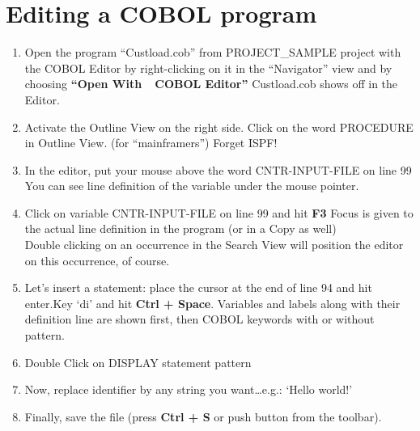 \chapter{Editing a COBOL program}

\begin{enumerate}
\item Open the program ``Custload.cob'' from PROJECT\_SAMPLE project with the COBOL Editor by right-clicking on it in the ``Navigator'' view and by choosing \textbf{``Open With~\RHD~COBOL Editor''}
Custload.cob shows off in the Editor.

\item  Activate the Outline View on the right side. Click on the word PROCEDURE in Outline View.
(for ``mainframers'') Forget ISPF!

\item In the editor, put your mouse above the word CNTR-INPUT-FILE on line 99
You can see line definition of the variable under the mouse pointer.

\item Click on variable CNTR-INPUT-FILE on line 99 and hit \textbf{F3}
Focus is given to the actual line definition in the program (or in a Copy as well)
\\[1.5ex]
Double clicking on an occurrence in the Search View will position the editor on this occurrence, of course.

\item Let's insert a statement: place the cursor at the end of line 94 and hit enter.Key `di' and hit \textbf{Ctrl + Space}.
Variables and labels along with their definition line are shown first, then COBOL keywords with or without pattern.

\item Double Click on DISPLAY statement pattern

\item Now, replace identifier by any string you want\dots e.g.: `Hello world!'

\item Finally, save the file (press \textbf{Ctrl + S} or push  button from the toolbar).

\end{enumerate}


